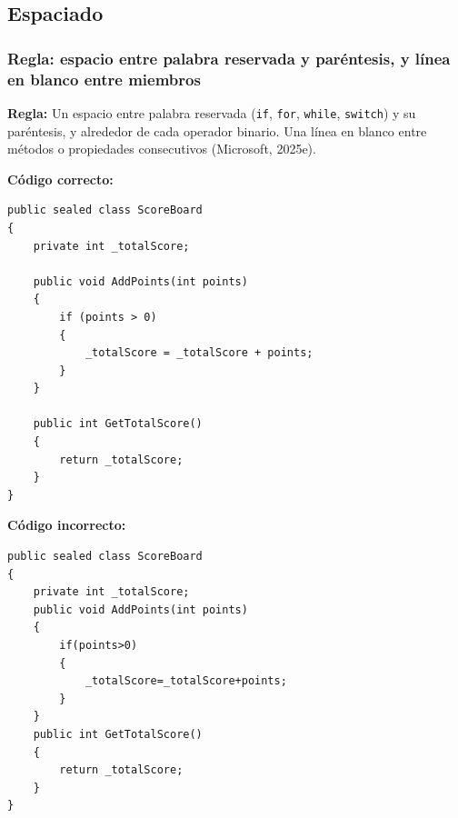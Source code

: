\subsection{Espaciado}

\subsubsection{Regla: espacio entre palabra reservada y paréntesis, y línea en blanco entre miembros}

\textbf{Regla:} Un espacio entre palabra reservada (\texttt{if}, \texttt{for}, \texttt{while}, \texttt{switch}) y su paréntesis, y alrededor de cada operador binario. Una línea en blanco entre métodos o propiedades consecutivos (Microsoft, 2025e).

\textbf{Código correcto:}
\begin{lstlisting}[style=csharpstyle]
public sealed class ScoreBoard
{
    private int _totalScore;

    public void AddPoints(int points)
    {
        if (points > 0)
        {
            _totalScore = _totalScore + points;
        }
    }

    public int GetTotalScore()
    {
        return _totalScore;
    }
}
\end{lstlisting}

\textbf{Código incorrecto:}
\begin{lstlisting}[style=csharpstyle]
public sealed class ScoreBoard
{
    private int _totalScore;
    public void AddPoints(int points)
    {
        if(points>0)
        {
            _totalScore=_totalScore+points;
        }
    }
    public int GetTotalScore()
    {
        return _totalScore;
    }
}
\end{lstlisting}
